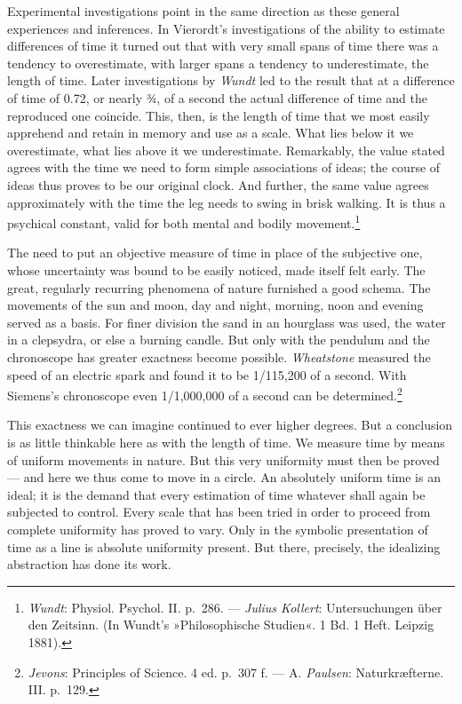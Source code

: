 \documentclass[12pt,a4paper]{book}
\newcommand{\opage}[1]{\marginnote{\footnotesize\textit{[#1]}}}
\begin{document}
Experimental investigations point in the same direction as these general
experiences and inferences. In Vierordt's investigations of the ability
to estimate differences of time it turned out that with very small spans
of time there was a tendency to overestimate, with larger spans a
tendency to underestimate, the length of time. Later investigations by
\emph{Wundt} led to the result that at a difference of time of 0.72, or
nearly ¾, of a second the actual difference of time and the reproduced
one coincide. This, then, is the length of time that we most easily
apprehend and retain in memory and use as a scale. What lies below it we
overestimate, what lies above it we underestimate. Remarkably, the value
stated agrees with the time we need to form simple associations of ideas;
\opage{234}the course of ideas thus proves to be our original clock. And
further, the same value agrees approximately with the time the leg needs
to swing in brisk walking. It is thus a psychical constant, valid for
both mental and bodily
movement.\footnote{\emph{Wundt}: Physiol. Psychol. II. p.~286. ---
\emph{Julius Kollert}: Untersuchungen über den Zeitsinn. (In Wundt's
»Philosophische Studien«. 1 Bd. 1 Heft. Leipzig 1881).}

The need to put an objective measure of time in place of the subjective
one, whose uncertainty was bound to be easily noticed, made itself felt
early. The great, regularly recurring phenomena of nature furnished a good
schema. The movements of the sun and moon, day and night, morning, noon
and evening served as a basis. For finer division the sand in an
hourglass was used, the water in a clepsydra, or else a burning candle.
But only with the pendulum and the chronoscope has greater exactness
become possible. \emph{Wheatstone} measured the speed of an electric
spark and found it to be 1/115,200 of a second. With Siemens's
chronoscope even
1/1,000,000 of a second can be determined.\footnote{\emph{Jevons}:
Principles of Science. 4 ed. p.~307 f. --- A. \emph{Paulsen}:
Naturkræfterne. III. p.~129.}

This exactness we can imagine continued to ever higher degrees. But a
conclusion is as little thinkable here as with the length of time. We
measure time by means of uniform movements in nature. But this very
uniformity must then be proved --- and here we thus come to move in a
circle. An absolutely uniform time is an ideal; it is the demand that
every estimation of time whatever shall again be subjected to control.
Every scale that has been tried in order to proceed from complete
uniformity has proved to vary. Only in the symbolic presentation of time
as a line is absolute uniformity present. But there, precisely, the
idealizing abstraction has done its work.
\end{document}

